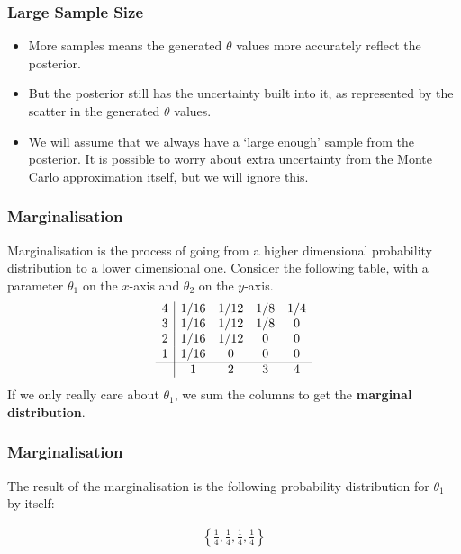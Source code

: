 \documentclass{beamer}
\begin{document}
\begin{frame}
\frametitle{Large Sample Size}

\begin{itemize}
\item More samples means the generated $\theta$ values more accurately
reflect the posterior.\pause
\item But the posterior still has the uncertainty built into it, as represented
by the scatter in the generated $\theta$ values.\pause
\item We will assume that we always have a `large enough'
sample from the posterior. It is possible to worry about extra
uncertainty from the Monte Carlo approximation itself, but we will ignore this.
\end{itemize}

\end{frame}



\begin{frame}
\frametitle{Marginalisation}
Marginalisation is the process of going from a higher dimensional probability
distribution to a lower dimensional one. Consider the following table,
with a parameter $\theta_1$ on the $x$-axis and $\theta_2$ on the $y$-axis.
\begin{align}
\begin{array}{c|cccc}
4 & 1/16 & 1/12 & 1/8 & 1/4 \\
3 & 1/16 & 1/12 & 1/8 & 0 \\
2 & 1/16 & 1/12 & 0   & 0 \\
1 & 1/16 & 0    & 0   & 0 \\
\hline
  & 1    & 2    & 3   & 4
\end{array}
\end{align}
\pause
If we only really care about $\theta_1$, we sum the columns
to get the {\bf marginal distribution}.


\end{frame}


\begin{frame}
\frametitle{Marginalisation}
The result of the marginalisation is the following probability distribution
for $\theta_1$ by itself:

\begin{center}
\begin{align}
\left\{\frac{1}{4}, \frac{1}{4}, \frac{1}{4}, \frac{1}{4}\right\}
\end{align}
\end{center}

\end{frame}
\end{document}
